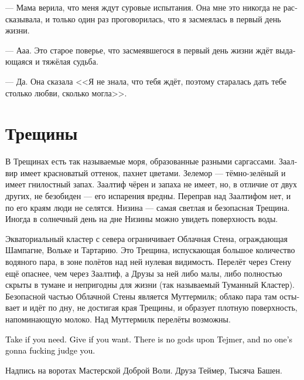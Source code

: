 \documentclass[a4paper,12pt,fleqn]{book}\usepackage{cooltooltips}\usepackage{polyglossia}\setdefaultlanguage[babelshorthands=true]{russian}\setotherlanguage{english}\defaultfontfeatures{Ligatures=TeX,Mapping=tex-text} \usepackage{xcolor}\definecolor{lightgray}{HTML}{bbbbbb}\color{lightgray}\newcommand{\ml}[3]{\textenglish{\textcolor{black}{#3}}}
\begin{document}
--- Мама верила, что меня ждут суровые испытания.
Она мне это никогда не рассказывала, и только один раз проговорилась, что я засмеялась в первый день жизни.

--- Ааа.
Это старое поверье, что засмеявшегося в первый день жизни ждёт выдающаяся и тяжёлая судьба.

--- Да.
Она сказала <<Я не знала, что тебя ждёт, поэтому старалась дать тебе столько любви, сколько могла>>.

\section{Трещины}

В Трещинах есть так называемые моря, образованные разными саргассами.
Заалвир имеет красноватый оттенок, пахнет цветами.
Зелемор --- тёмно-зелёный и имеет гнилостный запах.
Заалтиф чёрен и запаха не имеет, но, в отличие от двух других, не безобиден --- его испарения вредны.
Переправ над Заалтифом нет, и по его краям люди не селятся.
Низина --- самая светлая и безопасная Трещина.
Иногда в солнечный день на дне Низины можно увидеть поверхность воды.

Экваториальный кластер с севера ограничивает Облачная Стена, ограждающая Шампагне, Вольке и Тартарию.
Это Трещина, испускающая большое количество водяного пара, в зоне полётов над ней нулевая видимость.
Перелёт через Стену ещё опаснее, чем через Заалтиф, а Друзы за ней либо малы, либо полностью скрыты в тумане и непригодны для жизни (так называемый Туманный Кластер).
Безопасной частью Облачной Стены является Муттермилк;
облако пара там остывает и идёт по дну, не достигая края Трещины, и образует плотную поверхность, напоминающую молоко.
Над Муттермилк перелёты возможны.

\epigraph{
\ml{$0$}
{Если нужно --- возьми.}
{Take if you need.}
\ml{$0$}
{Если хочешь --- отдай.}
{Give if you want.}
\ml{$0$}
{Над Теймером нет богов, и никто, чёрт возьми, не будет тебя судить.}
{There is no gods upon Tejmer, and no one's gonna fucking judge you.}
}
{
Надпись на воротах Мастерской Доброй Воли.
Друза Теймер, Тысяча Башен.
}
\end{document}
